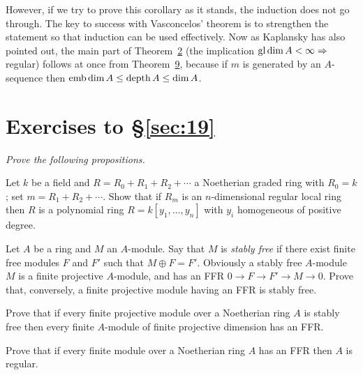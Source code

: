 However, if we try to prove this corollary as it stands, the induction
does not go through. The key to success with Vasconcelos' theorem is to
strengthen the statement so that induction can be used effectively. Now
as Kaplansky has also pointed out, the main part of Theorem~\hyperref[thm:19.2]{2} (the
implication $\operatorname{gl\,dim} A < \infty \Rightarrow$ regular) follows at once from Theorem~\hyperref[thm:19.9]{9},
because if $m$ is generated by an $A$-sequence then $\operatorname{emb\,dim} A \le \operatorname{depth} A \le
\dim A$.

\section*{Exercises to \S\ref{sec:19}}
\emph{Prove the following propositions.}

\begin{exercise}\label{ex:19.1-ex}
Let $k$ be a field and $R = R_0 + R_1 + R_2 + \cdots$ a Noetherian graded ring
with $R_0 = k$; set $m = R_1 + R_2 + \cdots$. Show that if $R_m$ is an $n$-dimensional
regular local ring then $R$ is a polynomial ring $R = k[y_1, \ldots, y_n]$ with $y_i$
homogeneous of positive degree.
\end{exercise}

\begin{exercise}\label{ex:19.2-ex}
Let $A$ be a ring and $M$ an $A$-module. Say that $M$ is \emph{stably free} if there exist
finite free modules $F$ and $F'$ such that $M \oplus F = F'$. Obviously a stably free
$A$-module $M$ is a finite projective $A$-module, and has an FFR $0 \to
F \to F' \to M \to 0$. Prove that, conversely, a finite projective module
having an FFR is stably free.
\end{exercise}

\begin{exercise}\label{ex:19.3-ex}
Prove that if every finite projective module over a Noetherian ring $A$ is
stably free then every finite $A$-module of finite projective dimension has an
FFR.
\end{exercise}

\begin{exercise}\label{ex:19.4-ex}
Prove that if every finite module over a Noetherian ring $A$ has an FFR
then $A$ is regular.
\end{exercise}
